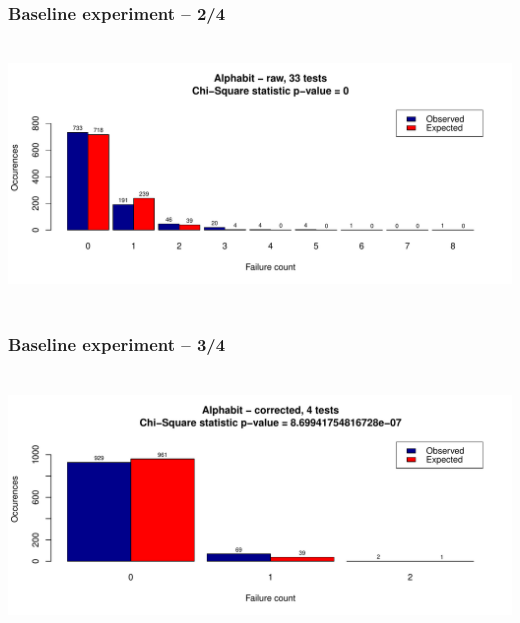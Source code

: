 \documentclass[aspectratio=169]{beamer}
\begin{document}
\begin{frame}
\frametitle{Baseline experiment -- 2/4}
\includegraphics[width=15cm, height=7cm]{figures/corrected_vs_raw/alphabit-raw.pdf} 
\begin{figure}
\begin{nomar}
\centering
\end{nomar}
\end{figure}

\end{frame}

\begin{frame}
\frametitle{Baseline experiment -- 3/4}
\includegraphics[width=15cm, height=7cm]{figures/corrected_vs_raw/alphabit-corrected.pdf} 
\begin{figure}
\begin{nomar}
\centering
\end{nomar}
\end{figure}

\end{frame}
\end{document}
